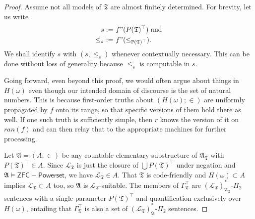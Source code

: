 \documentclass[12pt]{article}
\numberwithin{equation}{section}
\begin{document}
\begin{proof}
Assume not all models of $\mathfrak{T}$ are almost finitely determined. For brevity, let us write
\begin{align*}
    s := \ & f" (P(\mathfrak{T})^{\top}) \text{ and} \\
    \leq_s \ := \ & f" (\leq_{\mathbb{P}(\mathfrak{T})^{\top}}) \text{.}
\end{align*} 
We shall identify $s$ with $(s, \leq_s)$ whenever contextually necessary. This can be done without loss of generality because $\leq_s$ is computable in $s$.

Going forward, even beyond this proof, we would often argue about things in $H(\omega)$ even though our intended domain of discourse is the set of natural numbers. This is because first-order truths about $(H(\omega); \in)$ are uniformly propagated by $f$ onto its range, so that specific versions of them hold there as well. If one such truth is sufficiently simple, then $r$ knows the version of it on $ran(f)$ and can then relay that to the appropriate machines for further processing. 

Let $\mathfrak{A} = (A; \in)$ be any countable elementary substructure of $\mathfrak{A}_{\mathfrak{T}}$ with $P(\mathfrak{T})^{\top} \in A$. Since $\mathcal{L}_{\mathfrak{T}}$ is just the closure of $\bigcup P(\mathfrak{T})^{\top}$ under negation and $\mathfrak{A} \models \mathsf{ZFC - Powerset}$, we have $\mathcal{L}_{\mathfrak{T}} \in A$. That $\mathfrak{T}$ is code-friendly and $H(\omega) \subset A$ implies $\mathcal{L}_{\mathfrak{T}} \subset A$ too, so $\mathfrak{A}$ is $\mathcal{L}_{\mathfrak{T}}$-suitable. The members of $\Gamma_{\mathfrak{T}}^{\top}$ are $(\mathcal{L}_{\mathfrak{T}})^*_{\mathfrak{A}_{\mathfrak{T}}}$-$\Pi_2$ sentences with a single parameter $P(\mathfrak{T})^{\top}$ and quantification exclusively over $H(\omega)$, entailing that $\Gamma_{\mathfrak{T}}^{\top}$ is also a set of $(\mathcal{L}_{\mathfrak{T}})^*_{\mathfrak{A}}$-$\Pi_2$ sentences. 


\end{proof}
\end{document}
